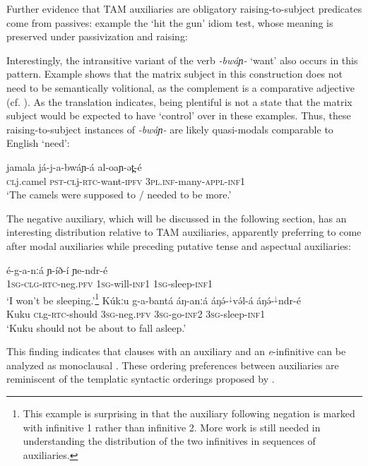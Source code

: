 Further evidence that TAM auxiliaries are obligatory raising-to-subject predicates come from passives: example the `hit the gun' idiom test, whose meaning is preserved under passivization and raising:


Interestingly, the intransitive variant of the verb \textit{-bwáɲ-} `want' also occurs in this pattern. Example  shows that the matrix subject in this construction does not need to be semantically volitional, as the complement is a comparative adjective (cf. ). As the translation indicates, being plentiful is not a state that the matrix subject would be expected to have `control' over in these examples. Thus, these raising-to-subject instances of \textit{-bwáɲ-} are likely quasi-modals comparable to English `need': 

\ea \gll jamala já-j-a-bwáɲ-á al-oaɲ-ət̪-é		\\		
\textsc{cl}j.camel \textsc{pst}-\textsc{cl}j-\textsc{rtc}-want-\textsc{ipfv} \textsc{3pl.inf}-many-\textsc{appl}-\textsc{inf1}\\
\glt ‘The camels were supposed to / needed to be more.’ \label{ex:ch15:camels2}
\z 

The negative auxiliary, which will be discussed in the following section, has an interesting distribution relative to TAM auxiliaries, apparently preferring to come after modal auxiliaries while preceding putative tense and aspectual auxiliaries:

\ea \ea  \gll  é-g-a-nːá ɲ-íð-í ɲe-ndr-é\\
\textsc{1sg-clg}-\textsc{rtc}-neg.\textsc{pfv} \textsc{1sg}-will-\textsc{inf1} \textsc{1sg}-sleep-\textsc{inf1}  \\
\glt `I won’t be sleeping.'\footnote{This example is surprising in that the auxiliary following negation is marked with infinitive 1 rather than infinitive 2. More work is still needed in understanding the distribution of the two infinitives in sequences of auxiliaries.}
\ex  \gll  Kúkːu g-a-bantá áŋ-anːá áŋə́-$^{↓}$və́l-á áŋə́-$^{↓}$ndr-é\\
Kuku \textsc{cl}g-\textsc{rtc}-should  \textsc{3sg}-neg.\textsc{pfv}  \textsc{3sg}-go-\textsc{inf2}  \textsc{3sg}-sleep-\textsc{inf1}  \\
\glt `Kuku should not be about to fall asleep.'
\z 
\z 

This finding indicates that clauses with an auxiliary and an \textit{e}-infinitive can be analyzed as monoclausal \citep[again, cf.][]{wurm03}. These ordering preferences between auxiliaries are reminiscent of the templatic syntactic orderings proposed by \citet{cinque99}.

